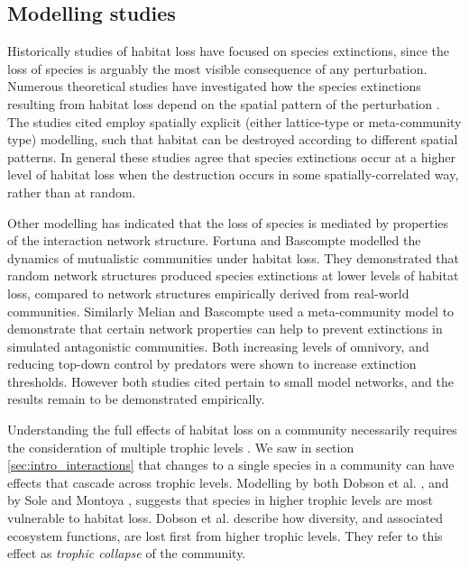 
\subsection{Modelling studies}
\label{sec:intro_modelling_HL}

Historically studies of habitat loss have focused on species extinctions, since the loss of species is arguably the most visible consequence of any perturbation. Numerous theoretical studies have investigated how the species extinctions resulting from habitat loss depend on the spatial pattern of the perturbation \cite{allen2007self,jager2006simulated,dytham1995effect,
hill1999habitat,travis2003climate,with1999extinction,ovaskainen2002metapopulation}. The studies cited employ spatially explicit (either lattice-type or meta-community type) modelling, such that habitat can be destroyed according to different spatial patterns. In general these studies agree that species extinctions occur at a higher level of habitat loss when the destruction occurs in some spatially-correlated way, rather than at random. 

Other modelling has indicated that the loss of species is mediated by properties of the interaction network structure. Fortuna and Bascompte \cite{fortuna2006habitat} modelled the dynamics of mutualistic communities under habitat loss. They demonstrated that random network structures produced species extinctions at lower levels of habitat loss, compared to network structures empirically derived from real-world communities. Similarly Melian and Bascompte \cite{melian2002food} used a meta-community model to demonstrate that certain network properties can help to prevent extinctions in simulated antagonistic communities. Both increasing levels of omnivory, and reducing top-down control by predators were shown to increase extinction thresholds. However both studies cited pertain to small model networks, and the results remain to be demonstrated empirically.     

Understanding the full effects of habitat loss on a community necessarily requires the consideration of multiple trophic levels \cite{dobson2006habitat,sole2006ecological}. We saw in section \ref{sec:intro_interactions} that changes to a single species in a community can have effects that cascade across trophic levels. Modelling by both Dobson et al. \cite{dobson2006habitat}, and by Sole and Montoya \cite{sole2006ecological}, suggests that species in higher trophic levels are most vulnerable to habitat loss. Dobson et al. describe how diversity, and associated ecosystem functions, are lost first from higher trophic levels. They refer to this effect as \emph{trophic collapse} of the community.

